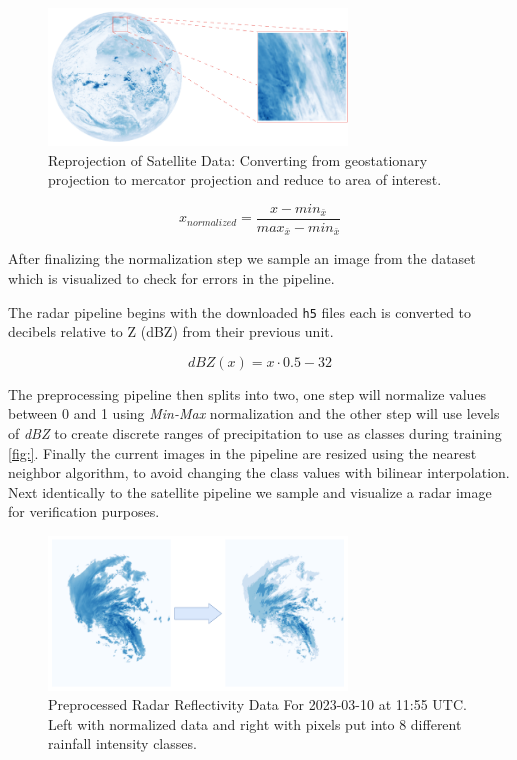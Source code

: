 \begin{figure}
  \centering
  \includegraphics[width=225pt]{./images/reprored.png}
  \caption{Reprojection of Satellite Data: Converting from geostationary projection to mercator projection and reduce to area of interest.}
  \label{fig:reprojection}
\end{figure}


\begin{equation}
  x_{normalized} = \frac{x-min_{\bar{x}}}{max_{\bar{x}}-min_{\bar{x}}}
\end{equation}

After finalizing the normalization step we sample an image from the dataset which is visualized to check for errors in the pipeline.
\medskip

The radar pipeline begins with the downloaded \texttt{h5} files each is converted to decibels relative to Z (dBZ) from their previous unit.

\begin{equation}
  dBZ(x) = x \cdot 0.5 - 32
\end{equation}

The preprocessing pipeline then splits into two, one step will normalize values between 0 and 1 using \textit{Min-Max} normalization and the other step will use levels of \textit{dBZ} to create discrete ranges of precipitation to use as classes during training \ref{fig:}.
Finally the current images in the pipeline are resized using the nearest neighbor algorithm, to avoid changing the class values with bilinear interpolation.
Next identically to the satellite pipeline we sample and visualize a radar image for verification purposes.

\begin{figure}
  \centering
  \includegraphics[width=225pt]{./images/bins.png}
  \caption{Preprocessed Radar Reflectivity Data For 2023-03-10 at 11:55 UTC. Left with normalized data and right with pixels put into 8 different rainfall intensity classes.}
  \label{fig:bins}
\end{figure}


